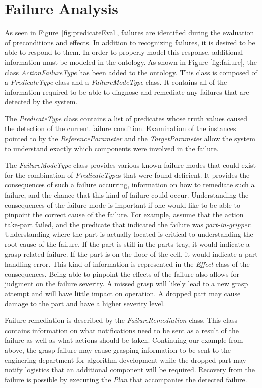 \section{Failure Analysis}
\label{sect:failure}
As seen in Figure~\ref{fig:predicateEval}, failures are identified during the evaluation of preconditions and effects. 
In addition to recognizing failures, it is desired to be able to respond to them.
In order to properly model this response, additional information must be modeled
in the ontology. As shown in Figure \ref{fig:failure}, the class {\it ActionFailureType} has been added to the ontology. This class is composed of a {\it PredicateType} class and a {\it FailureModeType} class. It contains all of the information required to be able to diagnose and remediate any failures that are detected by the system.

The {\it PredicateType} class contains a list of predicates whose truth values caused the detection of the current failure condition. Examination of the instances pointed to by the {\it ReferenceParameter} and the {\it TargetParameter} allow the system to understand exactly which components were involved in the failure.

The {\it FailureModeType} class provides various known failure modes that could exist for the combination of {\it PredicateType}s that were found deficient. It provides the consequences of such a failure occurring, information on how to remediate such a failure, and the chance that this kind of failure could occur. Understanding the consequences of the failure mode is important if one would like to be able to
pinpoint the correct cause of the failure. For example, assume that the action {\sc take-part} failed, and the predicate that indicated the failure was {\it part-in-gripper}. Understanding where the part is actually located is critical to understanding the root cause of the failure. If the part is still in the parts tray, it would indicate a grasp related failure. If the part is on the floor of the cell, it would indicate a part handling error. This kind of information is represented in the {\it Effect} class of the consequences. Being able to pinpoint the effects of the failure also allows for judgment on the failure severity. A missed grasp will likely lead to a new grasp attempt and will have little impact on operation. A dropped part may cause damage to the part and have a higher severity level.

Failure remediation is described by the {\it FailureRemediation} class. This class contains information on what notifications need to be sent as a result of the failure as well as what actions should be taken. Continuing our example from above, the grasp failure may cause grasping information to be sent to the enginering department for algorithm development while the dropped part may notify logistics that an additional component will be required. Recovery from the failure is possible by executing the {\it Plan} that accompanies the detected failure.
